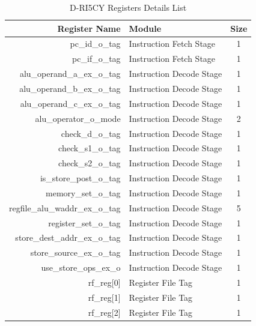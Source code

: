 \begin{table}
    \centering
    \scriptsize
    \caption{D-RI5CY Registers Details List}
    \label{tab:driscy_register_info}
    \begin{tabular}{rlc}
        \toprule
        Register Name                   & Module                       & Size \\
        \midrule
        pc\_id\_o\_tag                  & Instruction Fetch Stage      & 1    \\
        pc\_if\_o\_tag                  & Instruction Fetch Stage      & 1    \\
        alu\_operand\_a\_ex\_o\_tag     & Instruction Decode Stage     & 1    \\
        alu\_operand\_b\_ex\_o\_tag     & Instruction Decode Stage     & 1    \\
        alu\_operand\_c\_ex\_o\_tag     & Instruction Decode Stage     & 1    \\
        alu\_operator\_o\_mode          & Instruction Decode Stage     & 2    \\
        check\_d\_o\_tag                & Instruction Decode Stage     & 1    \\
        check\_s1\_o\_tag               & Instruction Decode Stage     & 1    \\
        check\_s2\_o\_tag               & Instruction Decode Stage     & 1    \\
        is\_store\_post\_o\_tag         & Instruction Decode Stage     & 1    \\
        memory\_set\_o\_tag             & Instruction Decode Stage     & 1    \\
        regfile\_alu\_waddr\_ex\_o\_tag & Instruction Decode Stage     & 5    \\
        register\_set\_o\_tag           & Instruction Decode Stage     & 1    \\
        store\_dest\_addr\_ex\_o\_tag   & Instruction Decode Stage     & 1    \\
        store\_source\_ex\_o\_tag       & Instruction Decode Stage     & 1    \\
        use\_store\_ops\_ex\_o          & Instruction Decode Stage     & 1    \\
        rf\_reg[0]                      & Register File Tag            & 1    \\
        rf\_reg[1]                      & Register File Tag            & 1    \\
        rf\_reg[2]                      & Register File Tag            & 1    \\

\end{tabular}
\end{table}
